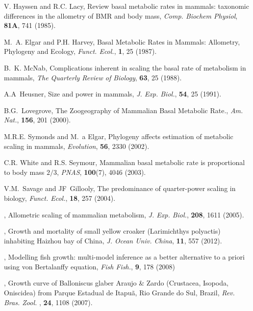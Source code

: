 \documentclass[10pt]{iopart}
\begin{document}
\begin{thebibliography}{100}
 V. Hayssen and R.C. Lacy, {Review basal metabolic rates in mammals:  taxonomic differences in the allometry of BMR and body mass}, \textit{Comp. Biochem Physiol}, \textbf{81A},  741 (1985).

 M.~A. Elgar and P.H. Harvey, {Basal Metabolic Rates in Mammals: Allometry, Phylogeny and Ecology}, \textit{Funct. Ecol.}, \textbf{1}, 25 (1987).

 B.~K. McNab, {Complications inherent in scaling the basal rate of metabolism in mammals}, \textit{The Quarterly Review of Biology}, \textbf{63}, 25 (1988).

 A.A~Heusner, {Size and power in mammals}, \textit{ J. Exp. Biol.}, \textbf{54}, 25 (1991).

 B.G.~Lovegrove, {The Zoogeography of Mammalian Basal Metabolic Rate.}, \textit{Am. Nat.}, \textbf{156}, 201 (2000).

 M.R.E. Symonds and M.~a Elgar, {Phylogeny affects estimation of metabolic scaling in mammals}, \textit{Evolution}, \textbf{56}, 2330 (2002).

 C.R. White and R.S. Seymour, {Mammalian basal metabolic rate is proportional to body mass $2/3$}, \textit{PNAS}, \textbf{100}(7), 4046 (2003).

 V.M.~Savage and JF~Gillooly, {The predominance of quarter-power scaling in biology}, \textit{Funct. Ecol.}, \textbf{18}, 257 (2004).

, {Allometric scaling of mammalian metabolism}, \textit{J. Exp. Biol.}, \textbf{208}, {1611} {(2005)}.

, {Growth and mortality of small yellow croaker (Larimichthys polyactis) inhabiting Haizhou bay of China}, \textit{J. Ocean Univ. China}, \textbf{11}, {557} {(2012)}.

, {Modelling fish growth: multi-model inference as a better alternative to a priori using von Bertalanffy equation}, \textit{Fish Fish.}, \textbf{9}, {178} {(2008)}

, {Growth curve of Balloniscus glaber Araujo \& Zardo (Crustacea, Isopoda, Oniscidea) from Parque Estadual de Itapuã, Rio Grande do Sul, Brazil}, \textit{Rev. Bras. Zool. }, \textbf{24}, {1108} {(2007)}.


\end{thebibliography}
\end{document}
